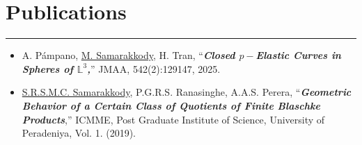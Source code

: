 \documentclass[12pt]{book}
\begin{document}




\section*{Publications}
\rule{\textwidth}{1pt}
\begin{itemize}
	\item A. P\'ampano, \underline{M. Samarakkody}, H. Tran, ``\textit{\textbf{Closed $p-$Elastic Curves in Spheres of $\mathbb{L}^{3}$,}}'' JMAA, 542(2):129147, 2025. 
 \item \underline{S.R.S.M.C. Samarakkody}, P.G.R.S. Ranasinghe, A.A.S. Perera, ``\textit{\textbf{Geometric Behavior of a Certain Class of Quotients of Finite Blaschke Products}},'' ICMME, Post Graduate Institute of Science, University of Peradeniya, Vol. 1. (2019).
\end{itemize}





 
\end{document}

